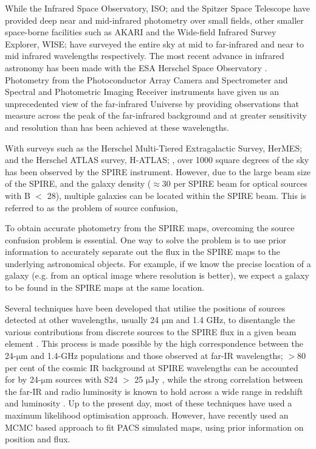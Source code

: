 \documentclass[useAMS,usenatbib]{mnras}
\begin{document}
While the Infrared Space Observatory, ISO; \cite{Kessler:1996} and the Spitzer Space Telescope \citep{Werner:2004} have provided deep near and mid-infrared photometry over small fields, other smaller space-borne facilities such as AKARI \citep{Murakami:2007} and the Wide-field Infrared Survey Explorer, WISE; \cite{Wright:2010} have surveyed the entire sky at mid to far-infrared and near to mid infrared wavelengths respectively. The most recent advance in infrared astronomy has been made with the ESA Herschel Space Observatory \citep{Pilbratt:2010}. Photometry from the Photoconductor Array Camera and Spectrometer \citep[PACS;][]{Poglitsch:2010} and Spectral and Photometric Imaging Receiver \citep[SPIRE;][]{Griffin:2010} instruments have given us an unprecedented view of the far-infrared Universe by providing observations that measure across the peak of the far-infrared background and at greater sensitivity and resolution than has been achieved at these wavelengths.

With surveys such as the Herschel Multi-Tiered Extragalactic Survey, HerMES; \cite{Oliver:2012} and the Herschel ATLAS survey, H-ATLAS; \cite{Eales:2010}, over 1000 square degrees of the sky has been observed by the SPIRE instrument. However, due to the large beam size of the SPIRE, and the galaxy density ($\approx 30$ per SPIRE beam for optical sources with B $<$ 28), multiple galaxies can be located within the SPIRE beam. This is referred to as the problem of source confusion, 


To obtain accurate photometry from the SPIRE maps, overcoming the source confusion problem is essential. One way to solve the problem is to use prior information to accurately separate out the flux in the SPIRE maps to the underlying astronomical objects. For example, if we know the precise location of a galaxy (e.g. from an optical image where resolution is better), we expect a galaxy to be found in the SPIRE maps at the same location.

Several techniques have been developed that utilise the positions of sources detected at other wavelengths, usually 24 $\mathrm{\mu m}$ and 1.4 GHz, to disentangle the various contributions from discrete sources to the SPIRE flux in a given beam element \citep[e.g.][]{Roseboom:2010, Roseboom:2011, Chapin:2011}. This process is made possible by the high correspondence between the 24-$\mathrm{\mu m}$ and 1.4-GHz populations and those observed at far-IR wavelengths; $>$80 per cent of the cosmic IR background at SPIRE wavelengths can be accounted for by 24-$\mathrm{\mu m}$ sources with S24 $>$ 25 $\mathrm{\mu Jy}$ \citep[e.g.]{Marsden:2009, Pascale:2009, Elbaz:2010}, while the strong correlation between the far-IR and radio luminosity is known to hold across a wide range in redshift and luminosity \citep[e.g.][]{Ivison:2010}. Up to the present day, most of these techniques have used a maximum likelihood optimisation approach. However, \cite{Safarzadeh:2015} have recently used an MCMC based approach to fit PACS simulated maps, using prior information on position and flux.
 
\end{document}
